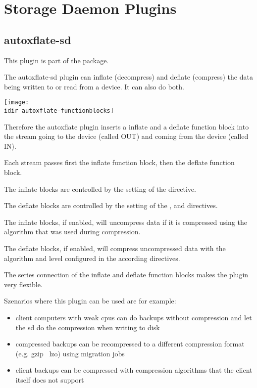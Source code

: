 

\section{Storage Daemon Plugins}
\label{sdPlugins}

\subsection{autoxflate-sd}
\label{plugin-autoxflate-sd}


This plugin is part of the  package.

The autoxflate-sd plugin can inflate (decompress) and deflate (compress)
the data being written to or read from a device. It can also do both.

\begin{center}
\texttt{[image: \\idir autoxflate-functionblocks]}
\end{center}

Therefore the autoxflate plugin inserts a inflate and a deflate function block
into the stream going to the device (called OUT) and coming from the device (called IN).

Each stream passes first the inflate function block, then the deflate function block.

The inflate blocks are controlled by the setting of the  directive.

The deflate blocks are controlled by the setting of the ,
 and  directives.

The inflate blocks, if enabled, will uncompress data if it is compressed using the
algorithm that was used during compression.

The deflate blocks, if enabled, will compress uncompressed data with the algorithm and level configured in the according directives.

The series connection of the inflate and deflate function blocks makes the plugin very flexible.

Szenarios where this plugin can be used are for example:
\begin{itemize}
   \item client computers with weak cpus can do backups without compression and let the sd do the compression when writing to disk
    \item compressed backups can be recompressed to a different compression format (e.g. gzip \textrightarrow\ lzo) using migration jobs
    \item client backups can be compressed with compression algorithms that the client itself does not support
\end{itemize}

